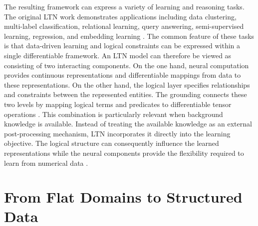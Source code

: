 The resulting framework can express a variety of learning and reasoning tasks. The original LTN work demonstrates applications including data clustering, multi-label classification, relational learning, query answering, semi-supervised learning, regression, and embedding learning \cite{badreddine2022logic}. The common feature of these tasks is that data-driven learning and logical constraints can be expressed within a single differentiable framework.
An LTN model can therefore be viewed as consisting of two interacting components. On the one hand, neural computation provides continuous representations and differentiable mappings from data to these representations. On the other hand, the logical layer specifies relationships and constraints between the represented entities. The grounding connects these two levels by mapping logical terms and predicates to differentiable tensor operations \cite{badreddine2022logic}.
This combination is particularly relevant when background knowledge is available. Instead of treating the available knowledge as an external post-processing mechanism, LTN incorporates it directly into the learning objective. The logical structure can consequently influence the learned representations while the neural components provide the flexibility required to learn from numerical data \cite{badreddine2022logic}.

\section{From Flat Domains to Structured Data}

